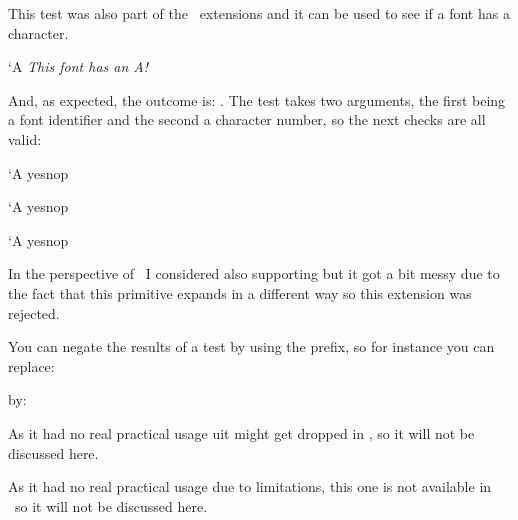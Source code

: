 \stopsubsection

\startsubsection[title={\tex{iffontchar}}]

This test was also part of the \ETEX\ extensions and it can be used to see if
a font has a character.

\startbuffer
\iffontchar\font`A
    {\em This font has an A!}
\fi
\stopbuffer

\typebuffer[option=TEX]

And, as expected, the outcome is: \quotation {\inlinebuffer}. The test takes two
arguments, the first being a font identifier and the second a character number,
so the next checks are all valid:

\starttyping[option=TEX]
\iffontchar\font     `A yes\else nop\fi\par
\iffontchar\nullfont `A yes\else nop\fi\par
\iffontchar{}`A yes\else nop\fi\par
\stoptyping

In the perspective of \LUAMETATEX\ I considered also supporting \type {\fontid}
but it got a bit messy due to the fact that this primitive expands in a different
way so this extension was rejected.

\stopsubsection

\startsubsection[title={\tex{unless}}]

You can negate the results of a test by using the \type {\unless} prefix, so for
instance you can replace:

\starttyping[option=TEX]
\ifdim\scratchdimen=10pt
    \dosomething
\else\ifdim\scratchdimen<10pt
    \dosomething
\fi\fi
\stoptyping

by:

\starttyping[option=TEX]
\unless\ifdim\scratchdimen>10pt
    \dosomething
\fi
\stoptyping

\stopsubsection

\stopsection

\startsection[title={\LUATEX\ primitives}]

\startsubsection[title={\tex{ifincsname}}]

As it had no real practical usage uit might get dropped in \LUAMETATEX, so it
will not be discussed here.

\stopsubsection

\startsubsection[title={\tex{ifprimitive}}]

As it had no real practical usage due to limitations, this one is not available
in \LUAMETATEX\ so it will not be discussed here.


